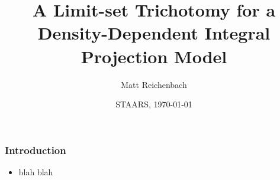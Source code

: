 \documentclass{beamer}
\title[Density Dependent Growth]{A Limit-set Trichotomy for a Density-Dependent Integral Projection Model}
\author[Matt Reichenbach]{Matt Reichenbach}
\date[\today]{STAARS, \today}
\begin{document}
\frame{\titlepage}


\begin{frame}
\frametitle{Introduction}
	\begin{itemize}
		\item blah blah
	\end{itemize}
\end{frame}
\end{document}
